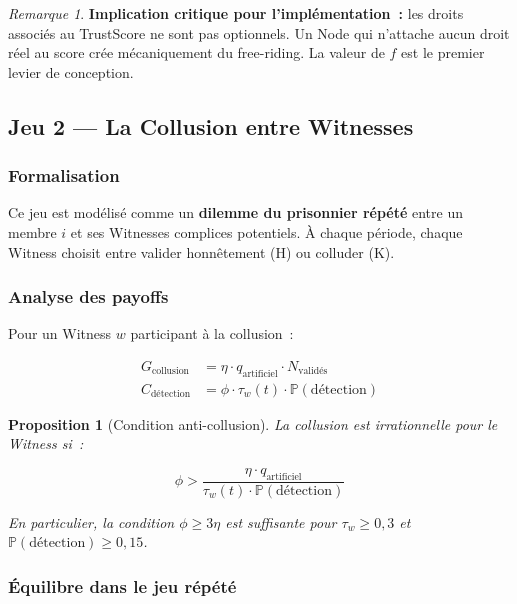 \documentclass[12pt,a4paper]{article}
\theoremstyle{definition}
\theoremstyle{plain}
\newtheorem{proposition}{Proposition}[section]
\theoremstyle{remark}
\newtheorem{remarque}{Remarque}[section]
\newcommand{\trustscore}{\tau}
\newcommand{\1}{\mathbf{1}}
\begin{document}
\begin{remarque}
\textbf{Implication critique pour l'implémentation~:} les droits associés au
TrustScore ne sont pas optionnels. Un Node qui n'attache aucun droit réel au
score crée mécaniquement du free-riding. La valeur de $f$ est le premier levier
de conception.
\end{remarque}

\subsection{Jeu 2 --- La Collusion entre Witnesses}

\subsubsection{Formalisation}

Ce jeu est modélisé comme un \textbf{dilemme du prisonnier répété} entre un
membre $i$ et ses Witnesses complices potentiels. À chaque période, chaque
Witness choisit entre valider honnêtement (H) ou colluder (K).

\subsubsection{Analyse des payoffs}

Pour un Witness $w$ participant à la collusion~:

\begin{align}
G_{\text{collusion}} &= \eta \cdot q_{\text{artificiel}} \cdot N_{\text{validés}} \\
C_{\text{détection}} &= \phi \cdot \trustscore_w(t) \cdot \mathbb{P}(\text{détection})
\end{align}

\begin{proposition}[Condition anti-collusion]
La collusion est irrationnelle pour le Witness si~:

\begin{equation}
\phi > \frac{\eta \cdot q_{\text{artificiel}}}{\trustscore_w(t) \cdot \mathbb{P}(\text{détection})}
\label{eq:anticollusion}
\end{equation}

En particulier, la condition $\phi \geq 3\eta$ est suffisante pour
$\trustscore_w \geq 0{,}3$ et $\mathbb{P}(\text{détection}) \geq 0{,}15$.
\end{proposition}

\subsubsection{Équilibre dans le jeu répété}
\end{document}
